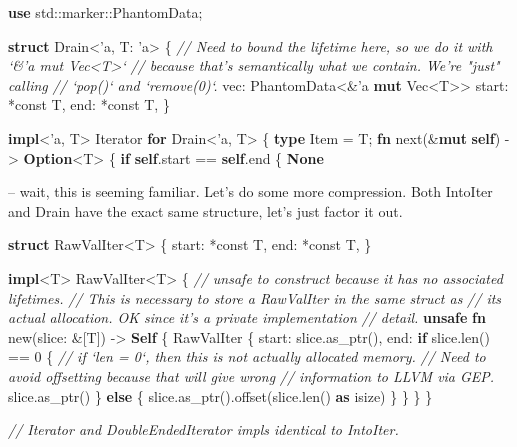 \documentclass[a4paper,]{book}
\newenvironment{Shaded}{\begin{snugshade}}{\end{snugshade}}
\newcommand{\KeywordTok}[1]{\textcolor[rgb]{0.13,0.29,0.53}{\textbf{{#1}}}}
\newcommand{\DecValTok}[1]{\textcolor[rgb]{0.00,0.00,0.81}{{#1}}}
\newcommand{\CommentTok}[1]{\textcolor[rgb]{0.56,0.35,0.01}{\textit{{#1}}}}
\newcommand{\OtherTok}[1]{\textcolor[rgb]{0.56,0.35,0.01}{{#1}}}
\newcommand{\NormalTok}[1]{{#1}}
\begin{document}
\begin{Shaded}
\begin{Highlighting}[]
\KeywordTok{use} \NormalTok{std::marker::PhantomData;}

\KeywordTok{struct} \NormalTok{Drain<}\OtherTok{'a}\NormalTok{, T: }\OtherTok{'a}\NormalTok{> \{}
    \CommentTok{// Need to bound the lifetime here, so we do it with `&'a mut Vec<T>`}
    \CommentTok{// because that's semantically what we contain. We're "just" calling}
    \CommentTok{// `pop()` and `remove(0)`.}
    \NormalTok{vec: PhantomData<&}\OtherTok{'a} \KeywordTok{mut} \NormalTok{Vec<T>>}
    \NormalTok{start: *const T,}
    \NormalTok{end: *const T,}
\NormalTok{\}}

\KeywordTok{impl}\NormalTok{<}\OtherTok{'a}\NormalTok{, T> Iterator }\KeywordTok{for} \NormalTok{Drain<}\OtherTok{'a}\NormalTok{, T> \{}
    \KeywordTok{type} \NormalTok{Item = T;}
    \KeywordTok{fn} \NormalTok{next(&}\KeywordTok{mut} \KeywordTok{self}\NormalTok{) -> }\KeywordTok{Option}\NormalTok{<T> \{}
        \KeywordTok{if} \KeywordTok{self}\NormalTok{.start == }\KeywordTok{self}\NormalTok{.end \{}
            \KeywordTok{None}
\end{Highlighting}
\end{Shaded}

-- wait, this is seeming familiar. Let's do some more compression. Both
IntoIter and Drain have the exact same structure, let's just factor it
out.

\begin{Shaded}
\begin{Highlighting}[]
\KeywordTok{struct} \NormalTok{RawValIter<T> \{}
    \NormalTok{start: *const T,}
    \NormalTok{end: *const T,}
\NormalTok{\}}

\KeywordTok{impl}\NormalTok{<T> RawValIter<T> \{}
    \CommentTok{// unsafe to construct because it has no associated lifetimes.}
    \CommentTok{// This is necessary to store a RawValIter in the same struct as}
    \CommentTok{// its actual allocation. OK since it's a private implementation}
    \CommentTok{// detail.}
    \KeywordTok{unsafe} \KeywordTok{fn} \NormalTok{new(slice: &[T]) -> }\KeywordTok{Self} \NormalTok{\{}
        \NormalTok{RawValIter \{}
            \NormalTok{start: slice.as_ptr(),}
            \NormalTok{end: }\KeywordTok{if} \NormalTok{slice.len() == }\DecValTok{0} \NormalTok{\{}
                \CommentTok{// if `len = 0`, then this is not actually allocated memory.}
                \CommentTok{// Need to avoid offsetting because that will give wrong}
                \CommentTok{// information to LLVM via GEP.}
                \NormalTok{slice.as_ptr()}
            \NormalTok{\} }\KeywordTok{else} \NormalTok{\{}
                \NormalTok{slice.as_ptr().offset(slice.len() }\KeywordTok{as} \NormalTok{isize)}
            \NormalTok{\}}
        \NormalTok{\}}
    \NormalTok{\}}
\NormalTok{\}}

\CommentTok{// Iterator and DoubleEndedIterator impls identical to IntoIter.}
\end{Highlighting}
\end{Shaded}
\end{document}
